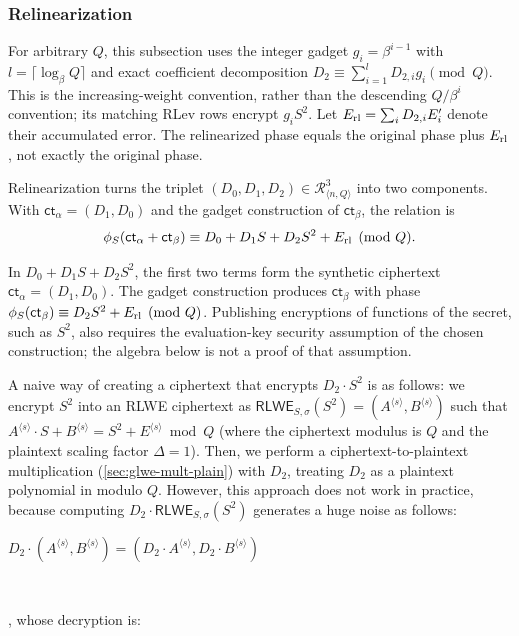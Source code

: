 \subsubsection{Relinearization}
\label{subsubsec:bfv-mult-cipher-relinearization}

For arbitrary $Q$, this subsection uses the integer gadget $g_i=\beta^{i-1}$ with $l=\lceil\log_\beta Q\rceil$ and exact coefficient decomposition $D_2\equiv\sum_{i=1}^lD_{2,i}g_i\pmod Q$. This is the increasing-weight convention, rather than the descending $Q/\beta^i$ convention; its matching RLev rows encrypt $g_iS^2$. Let $E_{\rm rl}=\sum_iD_{2,i}E_i'$ denote their accumulated error. The relinearized phase equals the original phase plus $E_{\rm rl}$, not exactly the original phase.

Relinearization turns the triplet $(D_0,D_1,D_2)\in\mathcal R_{\langle n,Q\rangle}^3$ into two components. With $\textsf{ct}_\alpha=(D_1,D_0)$ and the gadget construction of $\textsf{ct}_\beta$, the relation is
\[
\phi_S(\textsf{ct}_\alpha+\textsf{ct}_\beta)\equiv D_0+D_1S+D_2S^2+E_{\rm rl}\pmod Q.
\]

In $D_0+D_1S+D_2S^2$, the first two terms form the synthetic ciphertext $\textsf{ct}_\alpha=(D_1,D_0)$. The gadget construction produces $\textsf{ct}_\beta$ with phase $\phi_S(\textsf{ct}_\beta)\equiv D_2S^2+E_{\rm rl}\pmod Q$. Publishing encryptions of functions of the secret, such as $S^2$, also requires the evaluation-key security assumption of the chosen construction; the algebra below is not a proof of that assumption.

A naive way of creating a ciphertext that encrypts $D_2 \cdot S^2$ is as follows: we encrypt $S^2$ into an RLWE ciphertext as $\textsf{RLWE}_{S, \sigma}(S^2) = (A^{\langle s \rangle}, B^{\langle s \rangle})$ such that $A^{\langle s \rangle}\cdot S + B^{\langle s \rangle} = S^2 + E^{\langle s \rangle} \bmod Q$ (where the ciphertext modulus is $Q$ and the plaintext scaling factor $\Delta = 1$). Then, we perform a ciphertext-to-plaintext multiplication (\autoref{sec:glwe-mult-plain}) with $D_2$, treating $D_2$ as a plaintext polynomial in modulo $Q$. However, this approach does not work in practice, because computing $D_2 \cdot \textsf{RLWE}_{S, \sigma}(S^2)$ generates a huge noise as follows:

$D_2 \cdot (A^{\langle s \rangle}, B^{\langle s \rangle}) = (D_2\cdot A^{\langle s \rangle}, D_2 \cdot B^{\langle s \rangle})$

$ $

, whose decryption is:

